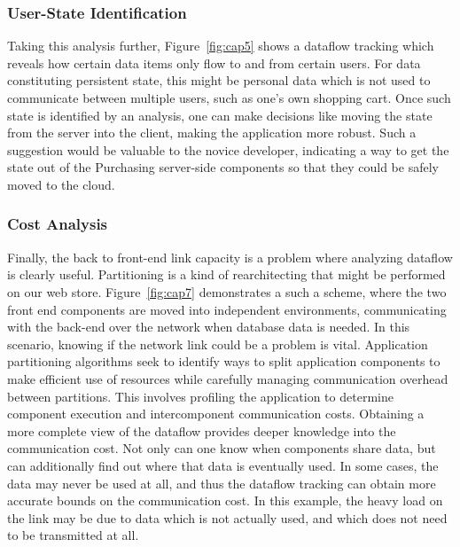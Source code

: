 \documentclass[msc,oneside]{ubcthesis}
\begin{document}
\subsubsection{User-State Identification}
Taking this analysis further, Figure~\ref{fig:cap5} shows a dataflow tracking which reveals how certain data items only flow to and from certain users. For data constituting persistent state, this might be personal data which is not used to communicate between multiple users, such as one's own shopping cart. Once such state is identified by an analysis, one can make decisions like moving the state from the server into the client, making the application more robust. Such a suggestion would be valuable to the novice developer, indicating a way to get the state out of the Purchasing server-side components so that they could be safely moved to the cloud.

\subsubsection{Cost Analysis}
Finally, the back to front-end link capacity is a problem where analyzing dataflow is clearly useful. Partitioning is a kind of rearchitecting that might be performed on our web store. Figure~\ref{fig:cap7} demonstrates a such a scheme, where the two front end components are moved into independent environments, communicating with the back-end over the network when database data is needed. In this scenario, knowing if the network link could be a problem is vital. Application partitioning algorithms seek to identify ways to split application components to make efficient use of resources while carefully managing communication overhead between partitions. This involves profiling the application to determine component execution and intercomponent communication costs. Obtaining a more complete view of the dataflow provides deeper knowledge into the communication cost. Not only can one know when components share data, but can additionally find out where that data is eventually used. In some cases, the data may never be used at all, and thus the dataflow tracking can obtain more accurate bounds on the communication cost. In this example, the heavy load on the link may be due to data which is not actually used, and which does not need to be transmitted at all.
	
\end{document}
